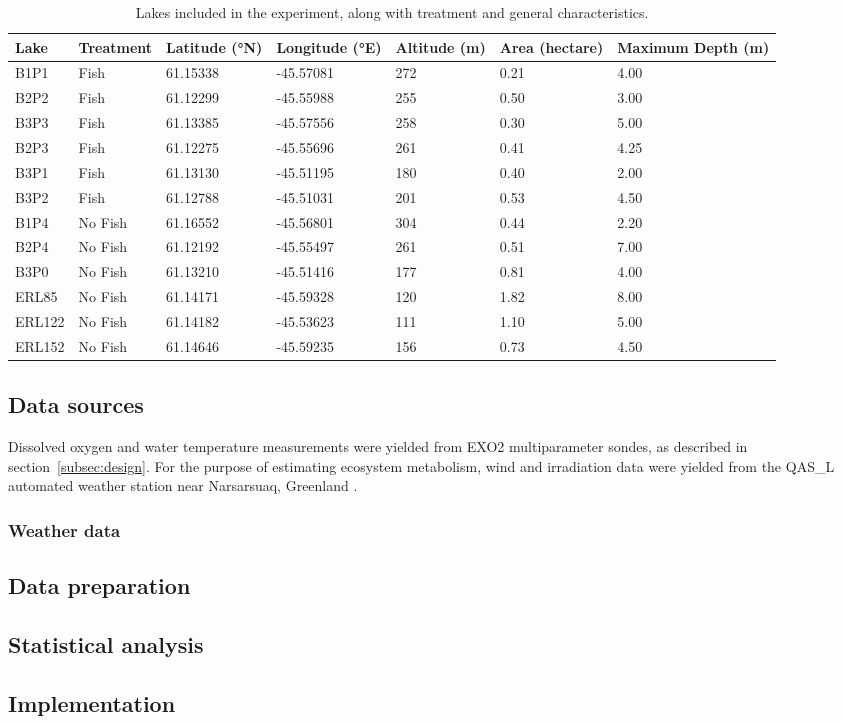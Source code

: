 \documentclass[fleqn,11pt,lineno]{manuscript}\usepackage[]{graphicx}\usepackage[]{xcolor}
\begin{document}
\begin{table}[ht]
\centering
\caption{Lakes included in the experiment, along with treatment
                and general characteristics.} 
\label{tab:lakes}
\begin{tabular}{lllllll}
  \toprule
Lake & Treatment & Latitude (°N) & Longitude (°E) & Altitude (m) & Area (hectare) & Maximum Depth (m) \\ 
  \midrule
B1P1 & Fish & 61.15338 & -45.57081 & 272 & 0.21 & 4.00 \\ 
  B2P2 & Fish & 61.12299 & -45.55988 & 255 & 0.50 & 3.00 \\ 
  B3P3 & Fish & 61.13385 & -45.57556 & 258 & 0.30 & 5.00 \\ 
  B2P3 & Fish & 61.12275 & -45.55696 & 261 & 0.41 & 4.25 \\ 
  B3P1 & Fish & 61.13130 & -45.51195 & 180 & 0.40 & 2.00 \\ 
  B3P2 & Fish & 61.12788 & -45.51031 & 201 & 0.53 & 4.50 \\ 
  B1P4 & No Fish & 61.16552 & -45.56801 & 304 & 0.44 & 2.20 \\ 
  B2P4 & No Fish & 61.12192 & -45.55497 & 261 & 0.51 & 7.00 \\ 
  B3P0 & No Fish & 61.13210 & -45.51416 & 177 & 0.81 & 4.00 \\ 
  ERL85 & No Fish & 61.14171 & -45.59328 & 120 & 1.82 & 8.00 \\ 
  ERL122 & No Fish & 61.14182 & -45.53623 & 111 & 1.10 & 5.00 \\ 
  ERL152 & No Fish & 61.14646 & -45.59235 & 156 & 0.73 & 4.50 \\ 
   \bottomrule
\end{tabular}
\end{table}


\subsection{Data sources} \label{subsec:source}

Dissolved oxygen and water temperature measurements were yielded from EXO2 multiparameter
sondes, as described in section~\ref{subsec:design}. For the purpose
of estimating ecosystem metabolism, wind and irradiation data were yielded
from the QAS\_L automated weather station near Narsarsuaq, Greenland \citep{metadata}.

\subsubsection*{Weather data}

\subsection{Data preparation}

\subsection{Statistical analysis}

\subsection{Implementation}
\end{document}
